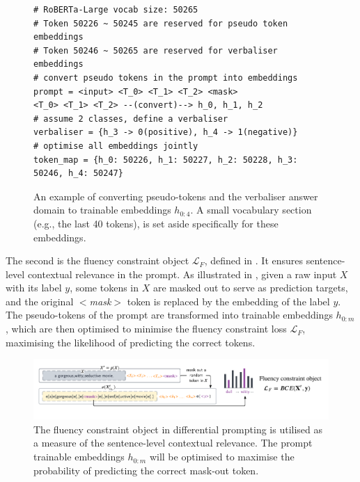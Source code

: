 \begin{figure}[!ht]
\centering
\begin{verbatim}
# RoBERTa-Large vocab size: 50265
# Token 50226 ~ 50245 are reserved for pseudo token embeddings
# Token 50246 ~ 50265 are reserved for verbaliser embeddings 
# convert pseudo tokens in the prompt into embeddings
prompt = <input> <T_0> <T_1> <T_2> <mask>
<T_0> <T_1> <T_2> --(convert)--> h_0, h_1, h_2
# assume 2 classes, define a verbaliser
verbaliser = {h_3 -> 0(positive), h_4 -> 1(negative)}
# optimise all embeddings jointly
token_map = {h_0: 50226, h_1: 50227, h_2: 50228, h_3: 50246, h_4: 50247}
\end{verbatim}
\caption{An example of converting pseudo-tokens and the verbaliser answer domain to trainable embeddings $h_{0:4}$. A small vocabulary section (e.g., the last 40 tokens),  is set aside specifically for these embeddings.}
\label{code:diff-1}
\end{figure}

The second is the fluency constraint object $\mathcal{L}_F$, defined in . It ensures sentence-level contextual relevance in the prompt. As illustrated in , given a raw input $X$ with its label $y$, some tokens in $X$ are masked out to serve as prediction targets, and the original $<$\textit{mask}$>$ token is replaced by the embedding of the label $y$. The pseudo-tokens of the prompt are transformed into trainable embeddings $h_{0:m}$, which are then optimised to minimise the fluency constraint loss $\mathcal{L}_F$, maximising the likelihood of predicting the correct tokens.

\begin{figure}[!ht]
    \centering
    \includegraphics[width=\hsize]{figures/implementation_media/impl-diff-fc.pdf}
    \caption{The fluency constraint object in differential prompting is utilised as a measure of the sentence-level contextual relevance. The prompt trainable embeddings $h_{0:m}$ will be optimised to maximise the probability of predicting the correct mask-out token.}
    \label{fig:impl-diff-2}
\end{figure}

